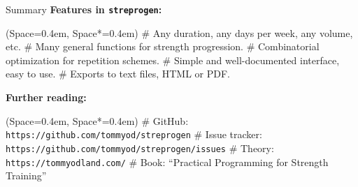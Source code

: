 \documentclass[11pt, aspectratio=149]{beamer}
\newcommand{\listSpace}{0.4em}
\theoremstyle{plain}
\begin{document}
\begin{frame}[fragile, t]{Summary}
	\vfill
	\textbf{Features in \texttt{streprogen}:}
	\begin{easylist}[itemize]
		\ListProperties(Space=\listSpace, Space*=\listSpace)
		# Any duration, any days per week, any volume, etc.
		# Many general functions for strength progression.
		# Combinatorial optimization for repetition schemes.
		# Simple and well-documented interface, easy to use.
		# Exports to text files, HTML or PDF.
	\end{easylist}
	\vfill
	\textbf{Further reading:}
\begin{easylist}[itemize]
	\ListProperties(Space=\listSpace, Space*=\listSpace)
	# GitHub: \texttt{https://github.com/tommyod/streprogen}
	# Issue tracker: \texttt{https://github.com/tommyod/streprogen/issues}
	# Theory: \texttt{https://tommyodland.com/}
	# Book: ``Practical Programming for Strength Training''
\end{easylist}
\vfill
\end{frame}
\end{document}
